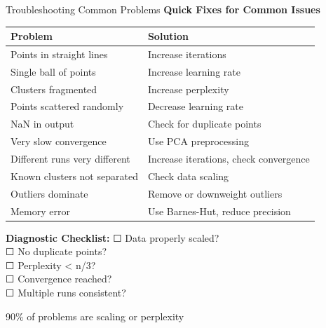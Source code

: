 \documentclass[10pt]{beamer}
\newcommand{\emphtext}[1]{\textcolor{upcblue}{\textbf{#1}}}
\newcommand{\conceptbox}[1]{\colorbox{upcblue!10}{\begin{minipage}{0.85\textwidth}\centering #1\end{minipage}}}
\begin{document}
\begin{frame}{Troubleshooting Common Problems}
\emphtext{Quick Fixes for Common Issues}

\vspace{0.3cm}
\begin{center}
\footnotesize
\begin{tabular}{ll}
\toprule
\textbf{Problem} & \textbf{Solution} \\
\midrule
Points in straight lines & Increase iterations \\
Single ball of points & Increase learning rate \\
Clusters fragmented & Increase perplexity \\
Points scattered randomly & Decrease learning rate \\
NaN in output & Check for duplicate points \\
Very slow convergence & Use PCA preprocessing \\
Different runs very different & Increase iterations, check convergence \\
Known clusters not separated & Check data scaling \\
Outliers dominate & Remove or downweight outliers \\
Memory error & Use Barnes-Hut, reduce precision \\
\bottomrule
\end{tabular}
\end{center}

\vspace{0.3cm}
\textbf{Diagnostic Checklist:}
\footnotesize
☐ Data properly scaled?\\
☐ No duplicate points?\\
☐ Perplexity < n/3?\\
☐ Convergence reached?\\
☐ Multiple runs consistent?

\begin{center}
\conceptbox{\footnotesize 90\% of problems are scaling or perplexity}
\end{center}
\end{frame}
\end{document}
